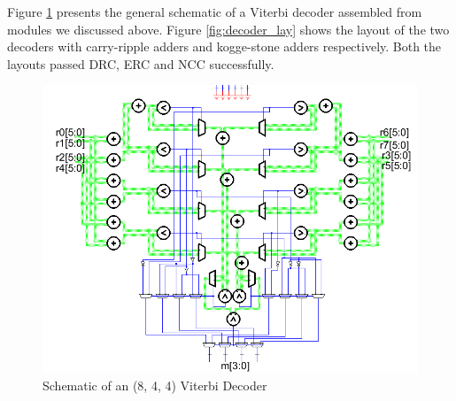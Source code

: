 \documentclass[conference]{IEEEtran}
\begin{document}
Figure \ref{fig:decoder_sch} presents the general schematic of a Viterbi decoder assembled from modules we discussed above. Figure \ref{fig:decoder_lay} shows the layout of the two decoders with carry-ripple adders and kogge-stone adders respectively. Both the layouts passed DRC, ERC and NCC successfully. 
\begin{figure}[h]
\centering
\includegraphics[scale=0.4]{decoder_sch}
\caption{Schematic of an (8, 4, 4) Viterbi Decoder}
\label{fig:decoder_sch}
\end{figure}
\end{document}
